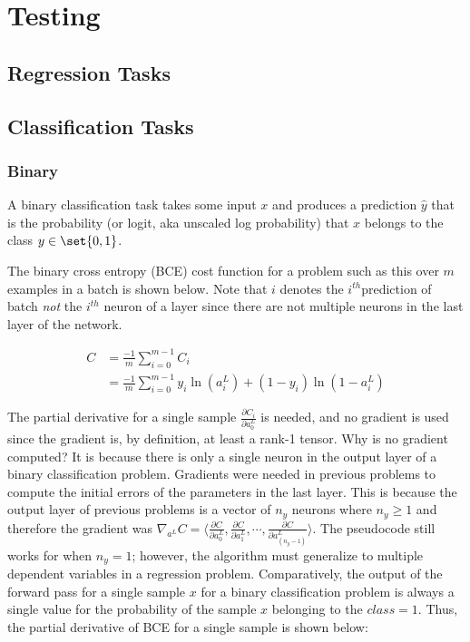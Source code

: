 \documentclass{article}
\DeclarePairedDelimiter\set\{\}
\begin{document}
\clearpage

\section{Testing}

\subsection{Regression Tasks}

\subsection{Classification Tasks}

\subsubsection{Binary}

A binary classification task takes some input $x$ and produces a prediction
$\hat{y}$ that is the probability (or logit, aka unscaled log probability) that
$x$ belongs to the class $y \in \set{0, 1}$.

The binary cross entropy (BCE) cost function for a problem such as this over
$m$ examples in a batch is shown below. Note that $i$ denotes
the $i^{th} $prediction of batch \textit{not} the $i^{th}$ neuron of a layer
since there are not multiple neurons in the last layer of the network.

\begin{equation}
	\begin{aligned}
		C & = \frac{-1}{m} \sum_{i = 0}^{m-1} {C_{i}}                                                     \\
		  & = \frac{-1}{m} \sum_{i = 0}^{m-1}{ y_{i} \ln{(a_{i}^{L})} + (1 - y_{i}) \ln{(1 - a_{i}^{L})}}
	\end{aligned}
\end{equation}

The partial derivative for a single sample $\frac{\partial C_i}{\partial a_{0}^{L}}$
is needed, and no gradient is used
since the gradient is, by definition, at least a rank-1 tensor. Why is no
gradient computed? It is because there is only a single neuron in the output
layer of a binary classification problem. Gradients were needed in previous
problems to compute the initial errors of the parameters in the last layer.
This is because the output layer of previous problems is a vector of $n_y$ neurons
where $n_y \geq 1$ and therefore the gradient was
${\nabla_{a^{L}} C = \langle \frac{\partial C}{\partial a_0^{L}}, \frac{\partial C}{\partial a_1^{L}}, \cdots, \frac{\partial C}{\partial a_{(n_{y} - 1)}^{L}} \rangle}$.
The pseudocode still works for when $n_y = 1$; however, the algorithm must
generalize to multiple dependent variables in a regression problem. Comparatively,
the output of the forward pass for a single sample $x$ for a binary classification
problem is always a single value for the probability of the sample $x$ belonging
to the $class = 1$.
Thus, the partial derivative of BCE for a single sample is shown below:
\end{document}
